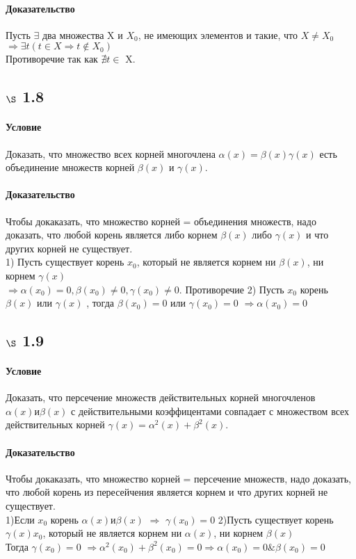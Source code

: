 \documentclass[a4paper,12pt]{article}
\begin{document}
\paragraph*{Доказательство}
Пусть $\exists$ два множества X и $X_0$, не имеющих элементов и такие, что $X \not= X_0$\\
$ \Rightarrow \exists t ( t \in X \Rightarrow  t \not\in X_0 )$\\
Противоречие так как $\nexists t \in$ X.

\subsection*{$\S$ 1.8}
\paragraph*{Условие}
Доказать, что множество всех корней многочлена $\alpha (x)=\beta (x) \gamma (x)$ есть объединение множеств корней $\beta (x)$ и $\gamma(x)$.
\paragraph*{Доказательство}
Чтобы докаказать, что множество корней = объединения множеств, надо доказать, что любой корень является либо корнем $\beta (x)$ либо $\gamma(x)$ и что других корней не существует.\\
1) Пусть существует корень $x_0$, который не является корнем ни $\beta (x)$, ни корнем $\gamma(x)$ \\
$\Rightarrow \alpha (x_0) = 0, \beta (x_0) \not= 0,  \gamma (x_0) \not= 0$. Противоречие
2) Пусть $x_0$ корень $\beta (x)$ или  $\gamma(x)$ , тогда  $\beta (x_0) = 0$ или $\gamma(x_0) = 0$ $\Rightarrow \alpha(x_0) = 0$

\subsection*{$\S$ 1.9}
\paragraph*{Условие}
Доказать, что персечение множеств действительных корней многочленов  $\alpha (x) и \beta (x)$ с действительными коэффицентами  совпадает с множеством всех действительных корней $\gamma(x) =\alpha^2 (x) + \beta^2 (x)  $.
\paragraph*{Доказательство}
Чтобы докаказать, что множество корней = персечение множеств, надо доказать, что любой корень из пересейчения является корнем и что других корней не существует.\\
1)Если $x_0$ корень $\alpha (x) и \beta (x)$ $\Rightarrow$ $\gamma(x_0) = 0$
2)Пусть существует корень  $\gamma(x) x_0$, который не является корнем ни $\alpha (x)$, ни корнем $\beta(x)$ \\
Тогда $\gamma(x_0) = 0$ $\Rightarrow \alpha^2 (x_0) + \beta^2 (x_0) = 0 \Rightarrow  \alpha(x_0) =  0 \& \beta (x_0) = 0$
\end{document}
